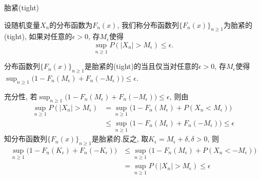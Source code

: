 \begin{frame}{胎紧(tight)}
	\vspace{-0.1cm}

	\begin{defi}设随机变量$X_n$的分布函数为$F_n(x)$, 我们称分布函数列$\{F_n(x)\}_{n\geq 1}$为胎紧的(tight), 如果对任意的$\epsilon>0$, 存$M_{\epsilon}$使得
	  \[\sup_{n\geq 1}P(|X_n|>M_{\epsilon})\leq\epsilon.\]
	\end{defi}
	\pause%
	\begin{thm}
		分布函数列$\{F_n(x)\}_{n\geq 1}$是胎紧的(tight)的当且仅当对任意的$\epsilon>0$, 存$M_{\epsilon}$使得$\sup_{n\geq 1} \big(1-F_{n}\left(M_{\epsilon}\right)+F_{n}\left(-M_{\epsilon}\right) \big)\leq \epsilon$.
	\end{thm}

	\zheng 充分性, 若$\sup_{n\geq 1} \big(1-F_{n}\left(M_{\epsilon}\right)+F_{n}\left(-M_{\epsilon}\right) \big)\leq \epsilon$, 则由
	{\small \begin{align*}
		\sup_{n\geq 1}P(|X_n|>M_{\epsilon})&=\sup_{n\geq 1}\big(1-F_n(M_{\epsilon})+P(X_n<M_{\epsilon})\big)\\
		&\leq \sup_{n\geq 1}\big(1-F_{n}\left(M_{\epsilon}\right)+F_{n}\left(-M_{\epsilon}\right)\big)\leq \epsilon
	\end{align*}}
	知分布函数列$\{F_n(x)\}_{n\geq 1}$是胎紧的.\pause  反之, 取$K_\epsilon=M_\epsilon+\delta, \delta>0$, 则
	{\small \begin{align*}
		\sup_{n\geq 1}\big(1-F_{n}\left(K_{\epsilon}\right)+F_{n}\left(-K_{\epsilon}\right)\big)&\leq \sup_{n\geq 1}\big(1-F_{n}\left(M_{\epsilon}\right)+P(X_n<-M_\epsilon)\big)\\
		&=\sup_{n\geq 1}P(|X_n|>M_{\epsilon})\leq  \epsilon
	\end{align*}}


	\end{frame}
